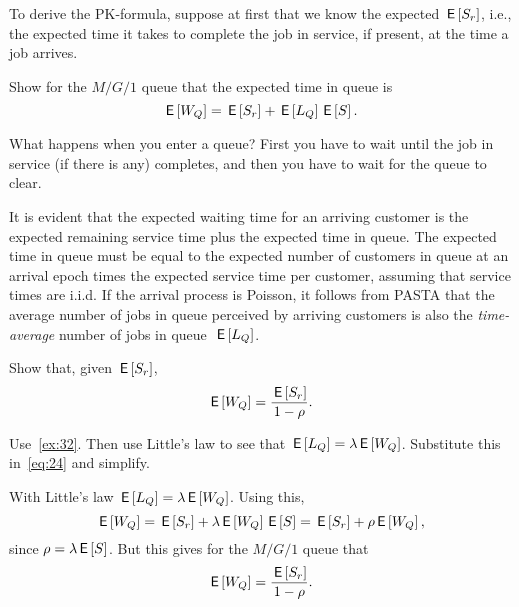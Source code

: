 To derive the PK-formula, suppose at first that we know the expected  $\,\mathsf{E}\left[S_r\right]$, i.e., the expected time it takes to complete the job in service, if present, at the time a job arrives.




\begin{extra}\label{ex:32}
Show for the $M/G/1$ queue  that the expected time in queue is
\begin{equation}\label{eq:24}
  \,\mathsf{E}\left[W_Q\right] = \,\mathsf{E}\left[S_r\right] + \,\mathsf{E}\left[L_Q\right] \,\mathsf{E}\left[S\right].
\end{equation}
\begin{hint}
  What happens when you enter a queue? First you have to wait until the job in service (if there is any) completes, and then you have to wait for the queue to clear.
\end{hint}
\begin{solution}
It is evident that the expected waiting time for an arriving customer is the expected
remaining service time plus the expected time in queue. The expected
time in queue  must be equal to the expected number of
customers in queue at an arrival epoch times the expected service time
per customer, assuming that service times are i.i.d. If the arrival
process is Poisson, it follows from PASTA that the average number of
jobs in queue perceived by arriving customers is also the
\emph{time-average} number of jobs in queue~$\,\mathsf{E}\left[L_Q\right]$.  
\end{solution}
\end{extra}


\begin{exercise}
Show that, given $\,\mathsf{E}\left[S_r\right]$, 
\begin{equation}\label{eq:35}
  \E{W_Q} = \frac{\E{S_r}}{1-\rho}.%
\end{equation}
\begin{hint}
  Use~\cref{ex:32}. Then use Little's law to see that $\,\mathsf{E}\left[L_Q\right] = \lambda \,\mathsf{E}\left[W_Q\right]$. Substitute this in~\cref{eq:24} and simplify.
\end{hint}
\begin{solution}
With  Little's law $\,\mathsf{E}\left[L_Q\right] = \lambda \,\mathsf{E}\left[W_Q\right]$. Using this,
\begin{equation*}
  \,\mathsf{E}\left[W_Q\right] = \,\mathsf{E}\left[S_r\right] + \lambda \,\mathsf{E}\left[W_Q\right] \,\mathsf{E}\left[S\right]  =\,\mathsf{E}\left[S_r\right] + \rho \,\mathsf{E}\left[W_Q\right],
\end{equation*}
since $\rho=\lambda \,\mathsf{E}\left[S\right]$. But this gives for the $M/G/1$ queue that
\begin{equation*}
  \,\mathsf{E}\left[W_Q\right] = \frac{\,\mathsf{E}\left[S_r\right]}{1-\rho}.
\end{equation*}
\end{solution}
\end{exercise}




